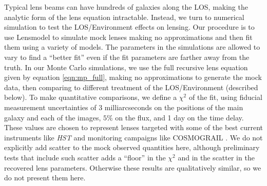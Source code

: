 Typical lens beams can have hundreds of galaxies along the LOS, making the analytic form of the lens equation intractable. Instead, we turn to numerical simulation to test the LOS/Environment effects on lensing. Our procedure is to use Lensmodel \citep{Keeton01} to simulate mock lenses making no approximations and then fit them using a variety of models. The parameters in the simulations are allowed to vary to find a ``better fit'' even if the fit parameters are farther away from the truth. In our Monte Carlo simulations, we use the full recursive lens equation given by equation \ref{eqn:mp_full}, making no approximations to generate the mock data, then comparing to different treatment of the LOS/Environment (described below). To make quantitative comparisons, we define a $\chi^2$ of the fit, using fiducial measurement uncertainties of 3 milliarcseconds on the positions of the main galaxy and each of the images, $5\%$ on the flux, and 1 day on the time delay. These values are chosen to represent lenses targeted with some of the best current instruments like \textit{HST} and monitoring campaigns like COSMOGRAIL \citep{Eigenbrod05}. We do not explicitly add scatter to the mock observed quantities here, although preliminary tests that include such scatter adds a ``floor'' in the $\chi^2$ and in the scatter in the recovered lens parameters. Otherwise these results are qualitatively similar, so we do not present them here.